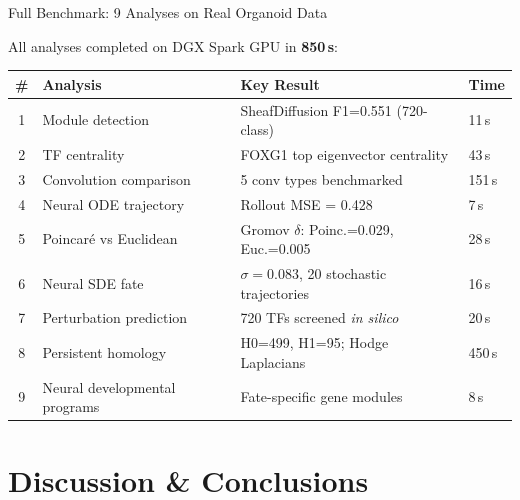\documentclass[aspectratio=169,11pt]{beamer}
\begin{document}

\begin{frame}{Full Benchmark: 9 Analyses on Real Organoid Data}

All analyses completed on DGX Spark GPU in \textbf{850\,s}:

\vspace{0.3em}

\begin{table}
\centering
\footnotesize
\begin{tabular}{clll}
\toprule
\textbf{\#} & \textbf{Analysis} & \textbf{Key Result} & \textbf{Time} \\
\midrule
1 & Module detection & SheafDiffusion F1=0.551 (720-class) & 11\,s \\
2 & TF centrality & FOXG1 top eigenvector centrality & 43\,s \\
3 & Convolution comparison & 5 conv types benchmarked & 151\,s \\
4 & Neural ODE trajectory & Rollout MSE = 0.428 & 7\,s \\
5 & Poincar\'{e} vs Euclidean & Gromov $\delta$: Poinc.=0.029, Euc.=0.005 & 28\,s \\
6 & Neural SDE fate & $\sigma=0.083$, 20 stochastic trajectories & 16\,s \\
7 & Perturbation prediction & 720 TFs screened \textit{in silico} & 20\,s \\
8 & Persistent homology & H0=499, H1=95; Hodge Laplacians & 450\,s \\
9 & Neural developmental programs & Fate-specific gene modules & 8\,s \\
\bottomrule
\end{tabular}
\end{table}

\end{frame}

\section{Discussion \& Conclusions}
\end{document}
